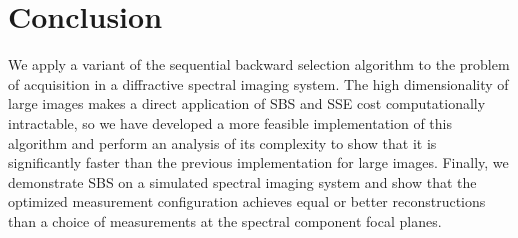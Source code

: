 \documentclass{article}
\begin{document}
\section{Conclusion}

We apply a variant of the sequential backward selection algorithm to the problem
of acquisition in a diffractive spectral imaging system.  The high
dimensionality of large images makes a direct application of SBS and SSE cost
computationally intractable, so we have developed a more feasible implementation
of this algorithm and perform an analysis of its complexity to show that it is
significantly faster than the previous implementation for large images.
Finally, we demonstrate SBS on a simulated spectral imaging system and show that
the optimized measurement configuration achieves equal or better reconstructions than a
choice of measurements at the spectral component focal planes.

\vfill\pagebreak



\end{document}
